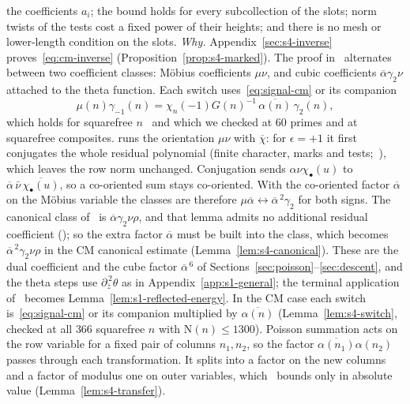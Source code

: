 \documentclass[11pt]{article}
\numberwithin{equation}{section}
\newcommand{\N}{\mathrm N}
\begin{document}
the coefficients $a_i$; the bound holds for every subcollection of the slots; norm twists of the tests cost a
fixed power of their heights; and there is no mesh or lower-length condition on the slots.
\emph{Why.} Appendix~\ref{sec:s4-inverse} proves~\eqref{eq:cm-inverse} (Proposition~\ref{prop:s4-marked}). The
proof in~\cite{OAI78} alternates between two coefficient classes: Möbius coefficients
$\mu\nu$, and cubic coefficients $\overline\alpha\gamma_2\nu$ attached to the theta function. Each
switch uses~\eqref{eq:signal-cm} or its companion
\begin{equation}\label{eq:d082}
 \mu(n)\gamma_{-1}(n)=\chi_n(-1)G(n)^{-1}\,\overline{\alpha(n)}\,\gamma_2(n),
\end{equation}
which holds for squarefree $n$~\cite[proof of Lemma~17.2, \emph{The second Poisson transformation}]{OAI78} and which we checked at $60$ primes and at squarefree
composites. \cite{OAI78} runs the orientation $\mu\nu$ with $\overline\chi$: for $\epsilon=+1$ it first conjugates
the whole residual polynomial (finite character, marks and tests;~\cite[proof of Lemma~17.1]{OAI78}), which leaves the
row norm unchanged. Conjugation sends $\alpha\nu\chi_\bullet(u)$ to $\overline\alpha\,\bar\nu\,\overline{\chi_\bullet(u)}$,
so a co-oriented sum stays co-oriented. With the co-oriented factor $\overline\alpha$ on the Möbius variable the
classes are therefore $\mu\overline\alpha\leftrightarrow\overline\alpha^{\,2}\gamma_2$ for both signs. The canonical
class of~\cite[Lemma~17.2]{OAI78} is $\overline\alpha\gamma_2\nu\rho$, and that lemma admits no
additional residual coefficient (\cite[Lemma~17.2]{OAI78}); so the extra factor $\overline\alpha$ must be built into
the class, which becomes $\overline\alpha^{\,2}\gamma_2\nu\rho$ in the CM canonical estimate
(Lemma~\ref{lem:s4-canonical}). These are the dual coefficient and the cube
factor $\overline\alpha^{\,6}$ of Sections~\ref{sec:poisson}--\ref{sec:descent}, and the theta steps use
$\partial_{\bar z}^{\,2}\theta$ as in Appendix~\ref{app:s1-general}; the terminal application
of~\cite[Lemma~14.3]{OAI78} becomes Lemma~\ref{lem:s1-reflected-energy}. In the CM case each switch
is~\eqref{eq:signal-cm} or its companion multiplied by $\overline{\alpha(n)}$ (Lemma~\ref{lem:s4-switch}, checked at
all $366$ squarefree $n$ with $\N(n)\le1300$). Poisson summation acts on the row variable for a fixed pair of
columns $n_1,n_2$, so the factor $\overline{\alpha(n_1)}\alpha(n_2)$ passes through each transformation. It splits
into a factor on the new columns and a factor of modulus one on outer variables, which~\cite{OAI78} bounds only in
absolute value (Lemma~\ref{lem:s4-transfer}).
\end{document}
